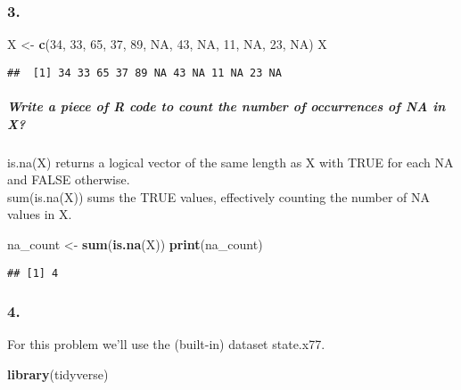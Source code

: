 \documentclass[
]{article}
\newenvironment{Shaded}{\begin{snugshade}}{\end{snugshade}}
\newcommand{\ConstantTok}[1]{\textcolor[rgb]{0.56,0.35,0.01}{#1}}
\newcommand{\DecValTok}[1]{\textcolor[rgb]{0.00,0.00,0.81}{#1}}
\newcommand{\FunctionTok}[1]{\textcolor[rgb]{0.13,0.29,0.53}{\textbf{#1}}}
\newcommand{\NormalTok}[1]{#1}
\newcommand{\OtherTok}[1]{\textcolor[rgb]{0.56,0.35,0.01}{#1}}
\begin{document}
\subsubsection{3.}\label{section-2}

\begin{Shaded}
\begin{Highlighting}[]
\NormalTok{X }\OtherTok{\textless{}{-}} \FunctionTok{c}\NormalTok{(}\DecValTok{34}\NormalTok{, }\DecValTok{33}\NormalTok{, }\DecValTok{65}\NormalTok{, }\DecValTok{37}\NormalTok{, }\DecValTok{89}\NormalTok{, }\ConstantTok{NA}\NormalTok{, }\DecValTok{43}\NormalTok{, }\ConstantTok{NA}\NormalTok{, }\DecValTok{11}\NormalTok{, }\ConstantTok{NA}\NormalTok{, }\DecValTok{23}\NormalTok{, }\ConstantTok{NA}\NormalTok{)}
\NormalTok{X}
\end{Highlighting}
\end{Shaded}

\begin{verbatim}
##  [1] 34 33 65 37 89 NA 43 NA 11 NA 23 NA
\end{verbatim}

\subparagraph{Write a piece of R code to count the number of occurrences
of NA in
X?}\label{write-a-piece-of-r-code-to-count-the-number-of-occurrences-of-na-in-x}

is.na(X) returns a logical vector of the same length as X with TRUE for
each NA and FALSE otherwise.\\
sum(is.na(X)) sums the TRUE values, effectively counting the number of
NA values in X.

\begin{Shaded}
\begin{Highlighting}[]
\NormalTok{na\_count }\OtherTok{\textless{}{-}} \FunctionTok{sum}\NormalTok{(}\FunctionTok{is.na}\NormalTok{(X))}
\FunctionTok{print}\NormalTok{(na\_count)}
\end{Highlighting}
\end{Shaded}

\begin{verbatim}
## [1] 4
\end{verbatim}

\subsubsection{4.}\label{section-3}

For this problem we'll use the (built-in) dataset state.x77.

\begin{Shaded}
\begin{Highlighting}[]
\FunctionTok{library}\NormalTok{(tidyverse)}
\end{Highlighting}
\end{Shaded}
\end{document}
